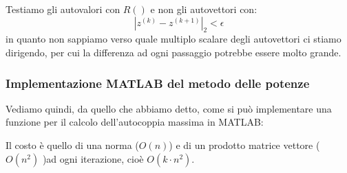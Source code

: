 \documentclass[a4paper,11pt]{article}
\begin{document}
Testiamo gli autovalori con $R()$ e non gli autovettori con:
$$
|z^{(k)} - z^{(k + 1)}|_2 < \epsilon
$$
in quanto non sappiamo verso quale multiplo scalare degli autovettori ci stiamo dirigendo, per cui la differenza ad ogni passaggio potrebbe essere molto grande.

\subsubsection{Implementazione MATLAB del metodo delle potenze}
Vediamo quindi, da quello che abbiamo detto, come si può implementare una funzione per il calcolo dell'autocoppia massima in MATLAB:
\lstset{style=codestyle, language=MATLAB}


Il costo è quello di una norma ($O(n)$) e di un prodotto matrice vettore ($O(n^2)$ )ad ogni iterazione, cioè $O(k \cdot n^2)$.
\end{document}

